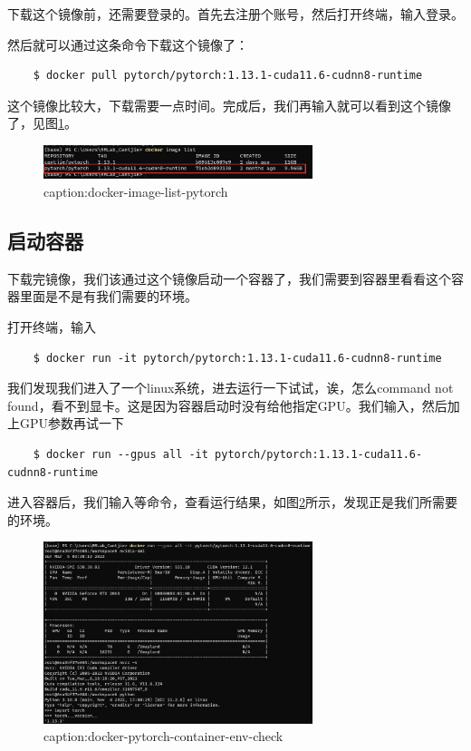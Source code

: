 下载这个镜像前，还需要登录的。首先去注册个账号，然后打开终端，输入登录。

然后就可以通过这条命令下载这个镜像了：

\begin{lstlisting}
    $ docker pull pytorch/pytorch:1.13.1-cuda11.6-cudnn8-runtime
\end{lstlisting}


这个镜像比较大，下载需要一点时间。完成后，我们再输入就可以看到这个镜像了，见图\ref{fig:docker-image-list-pytorch}。
\begin{figure}[htbp]
	\centering
	\includegraphics[width=0.7\textwidth]{figures/docker-image-list-pytorch.png}
	\caption{caption:docker-image-list-pytorch}
	\label{fig:docker-image-list-pytorch}
\end{figure}

\subsection{启动容器}

下载完镜像，我们该通过这个镜像启动一个容器了，我们需要到容器里看看这个容器里面是不是有我们需要的环境。

打开终端，输入
\begin{lstlisting}
    $ docker run -it pytorch/pytorch:1.13.1-cuda11.6-cudnn8-runtime
\end{lstlisting}
我们发现我们进入了一个linux系统，进去运行一下试试，诶，怎么command not found，看不到显卡。这是因为容器启动时没有给他指定GPU。我们输入，然后加上GPU参数再试一下
\begin{lstlisting}
    $ docker run --gpus all -it pytorch/pytorch:1.13.1-cuda11.6-cudnn8-runtime 
\end{lstlisting}

进入容器后，我们输入等命令，查看运行结果，如图\ref{fig:docker-pytorch-container-env-check}所示，发现正是我们所需要的环境。
\begin{figure}[htbp]
	\centering
	\includegraphics[width=0.7\textwidth]{figures/docker-pytorch-container-env-check.png}
	\caption{caption:docker-pytorch-container-env-check}
	\label{fig:docker-pytorch-container-env-check}
\end{figure}

